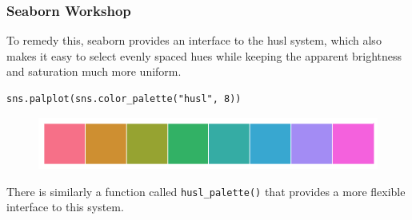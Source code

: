 \documentclass{beamer}
\begin{document}
\begin{frame}[fragile]
\frametitle{Seaborn Workshop}
\large

To remedy this, seaborn provides an interface to the husl system, which also makes it easy to select evenly spaced hues while keeping the apparent brightness and saturation much more uniform.
\begin{verbatim}
sns.palplot(sns.color_palette("husl", 8))
\end{verbatim}

\begin{figure}
\centering
\includegraphics[width=0.7\linewidth]{images/color_palettes_14_0}
\caption{}
\label{fig:color_palettes_14_0}
\end{figure}

There is similarly a function called \texttt{husl\_palette()} that provides a more flexible interface to this system.
\end{frame}
\end{document}

